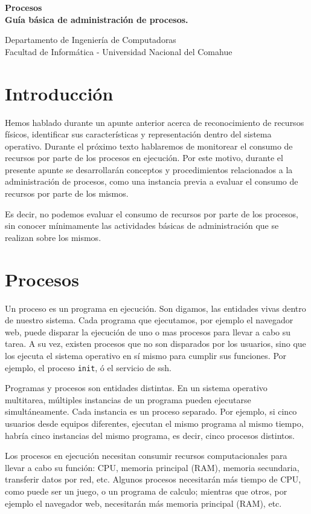 \documentclass[12pt]{article}
\def\maketitle{

 \makeatletter
 {\color{bl} \centering \huge \sc \textbf{
 Procesos \\ 
\large \vspace*{-8pt} \color{black} Guía básica de administración de procesos. 
 \vspace*{8pt} }\par}
 \makeatother


 \makeatletter
 {\centering \small 
 	Departamento de Ingeniería de Computadoras \\
 	Facultad de Informática - Universidad Nacional del Comahue \\
 	\vspace{20pt} }
 \makeatother

}
\begin{document}
\thispagestyle{empty}
\maketitle
\setlength{\parindent}{0pt}

\section*{Introducción}

Hemos hablado durante un apunte anterior acerca de reconocimiento de 
recursos físicos, identificar sus características y representación dentro 
del sistema operativo. Durante el próximo texto hablaremos de 
monitorear el consumo de recursos por parte de los procesos en ejecución. 
Por este motivo, durante el presente apunte se desarrollarán conceptos y 
procedimientos relacionados a la administración de procesos, como una 
instancia previa a evaluar el consumo de recursos por parte de los mismos.

Es decir, no podemos evaluar el consumo de recursos por parte de los
procesos, sin conocer mínimamente las actividades básicas de administración
que se realizan sobre los mismos. 


\section*{Procesos}

Un proceso es un programa en ejecución. Son digamos, las entidades vivas 
dentro de nuestro sistema. Cada programa que ejecutamos, por ejemplo el 
navegador web, puede disparar la ejecución de uno o mas procesos para 
llevar a cabo su tarea.  A su vez, existen procesos que no son disparados 
por los usuarios, sino que los ejecuta el sistema operativo en sí mismo 
para cumplir sus funciones. Por ejemplo, el proceso \texttt{init}, ó el 
servicio de ssh. 

Programas y procesos son entidades distintas. En un sistema operativo 
multitarea, múltiples instancias de un programa pueden ejecutarse 
simultáneamente. Cada instancia es un proceso separado. Por ejemplo, si cinco 
usuarios desde equipos diferentes, ejecutan el mismo programa al mismo tiempo, 
habría cinco instancias del mismo programa, es decir, cinco procesos distintos.


Los procesos en ejecución necesitan consumir recursos computacionales para 
llevar a cabo su función: CPU, memoria principal (RAM), memoria secundaria, 
transferir datos por red, etc. Algunos procesos necesitarán más tiempo de 
CPU, como puede ser un juego, o un programa de calculo; mientras que 
otros, por ejemplo el navegador web, necesitarán más memoria principal 
(RAM), etc.
\end{document}
